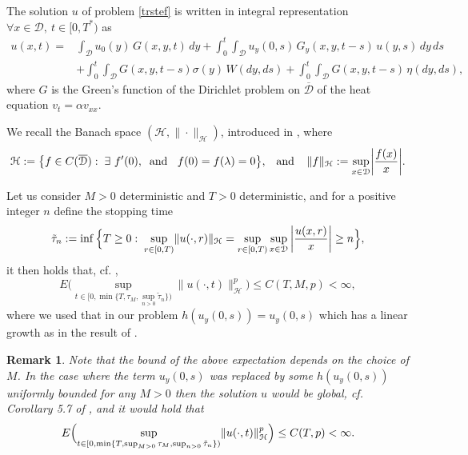 \documentclass[reqno]{amsart}
\numberwithin{equation}{section}
\newtheorem{remark}[theorem]{Remark}
\newcommand{\cd}{\mathcal{D}}
\newcommand{\ch}{\mathcal{H}}
\begin{document}
The solution $ u $ of problem \eqref{trstef} is written in integral representation
$\forall x\in \cd,\ t\in[0,T^{*})$ as
\begin{equation}\label{int}
\begin{split}
u(x,t) = & \int_{\mathcal{D}}u_0(y) \,G(x,y,t)\, dy +\int_0^t\int_{\mathcal{D}}u_y(0,s) \,G_{y}(x,y,t-s) \,u(y,s)\, dy\,ds\\
&+\int_0^t\int_{\cd}G(x,y,t-s)\sigma(y) \, W(dy,ds)
+\int_0^t\int_{\cd} G(x,y,t-s) \,\eta(dy,ds),
\end{split}
\end{equation}
where $G$ is the Green's function of the Dirichlet problem on
$\overline{\cd}$ of the heat equation $v_t=\alpha v_{xx}$. %

We recall the Banach space
$(\mathcal{H},\|\cdot\|_{\mathcal{H}})$, introduced in \cite{BH},
where
\begin{equation}\label{bansp}
\ch:=\big{\{}f\in C(\overline{\mathcal{D}}):\; \exists\ f'(0),\;\;
\mbox{and}\;\;\ f(0)=f(\lambda)=0\big{\}},\;\;\;
\text{and}\;\;\;\;\|f\|_{\ch}:=\displaystyle{\sup_{x\in\mathcal{D}}}\bigg{|}\dfrac{f(x)}{x}\bigg{|}.
\end{equation}

Let us consider $M>0$ deterministic and $T>0$ deterministic, and for a positive integer $n$ define the stopping time
\begin{equation}\label{stimen}
\tilde{\tau}_n:=\inf\Big{\{}T\geq
0:\;\displaystyle{\sup_{r\in[0,T)}}\|u(\cdot,r)\|_{\mathcal{H}}=\displaystyle{\sup_{r\in[0,T)}}\, \displaystyle{\sup_{x\in\mathcal{D}}}\, \bigg{|}\dfrac{u(x,r)}{x}\bigg{|}\geq
n\Big{\}},
\end{equation}
it then holds that, cf.
\cite{BH},
\begin{equation}\label{imp1}
E\Big(\sup_{t\in[0,\min\{T,\tau_M,\sup_{n>0}\tilde{\tau}_n\})}\|u(\cdot,t)\|_{\mathcal{H}}^p\Big)\leq
C(T,M,p)<\infty,
\end{equation}
where we used that in our problem
$h(u_y(0,s))=u_y(0,s)$ which has a linear growth as in the
result of \cite{BH}.
\begin{remark}\label{glob}
Note that the bound of the above expectation depends on the choice of $M$. In the case where the term $u_{y}(0,s)$ was replaced by some $h(u_{y}(0,s))$ uniformly bounded for any $M>0$ then the
solution $u$ would be global, cf. Corollary 5.7 of \cite{BH}, and it would hold that
\begin{equation}\label{imp2}
E\Big{(}\displaystyle{\sup_{t\in[0,\min\{T,\sup_{M>0}\tau_M,\sup_{n>0}\tilde{\tau}_n\})}}\|u(\cdot,t)\|_{\mathcal{H}}^p\Big{)}\leq
C(T,p)<\infty.
\end{equation}
\end{remark}
\end{document}
